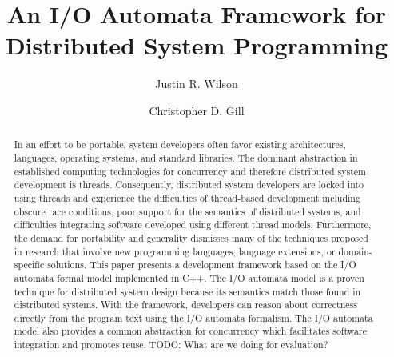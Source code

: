 \documentclass[letterpaper]{article}
\begin{document}
\title{An I/O Automata Framework for Distributed System Programming}
\author{Justin R. Wilson \and Christopher D. Gill}
\date{}

\maketitle

\begin{abstract}
In an effort to be portable, system developers often favor existing architectures, languages, operating systems, and standard libraries.
The dominant abstraction in established computing technologies for concurrency and therefore distributed system development is threads.
Consequently, distributed system developers are locked into using threads and experience the difficulties of thread-based development including obscure race conditions, poor support for the semantics of distributed systems, and difficulties integrating software developed using different thread models.
Furthermore, the demand for portability and generality dismisses many of the techniques proposed in research that involve new programming languages, language extensions, or domain-specific solutions.
This paper presents a development framework based on the I/O automata formal model implemented in C++.
The I/O automata model is a proven technique for distributed system design because its semantics match those found in distributed systems.
With the framework, developers can reason about correctness directly from the program text using the I/O automata formalism.
The I/O  automata model also provides a common abstraction for concurrency which facilitates software integration and promotes reuse.
TODO:  What are we doing for evaluation?
\end{abstract}
\end{document}
